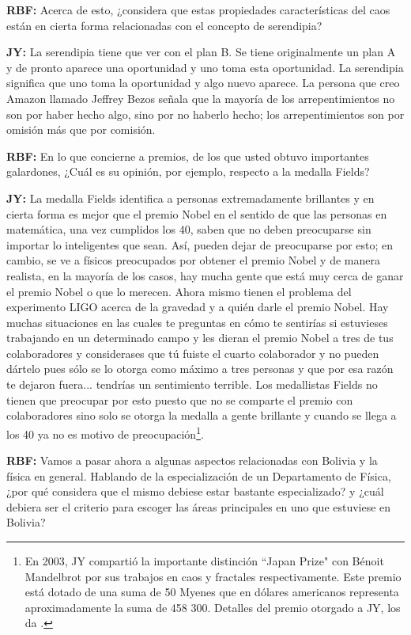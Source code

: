 \documentclass{rbf}
\newcommand{\mr}{{\bf RBF: }}
\newcommand{\jim}{{\bf JY: }}
\begin{document}
\mr Acerca de esto, ¿considera que estas propiedades características del caos están en cierta forma relacionadas con el concepto de serendipia?

\jim La serendipia tiene que ver con el plan B. Se tiene originalmente un plan A y de pronto aparece una oportunidad y uno toma esta oportunidad. La serendipia significa que uno toma la oportunidad y algo nuevo aparece. La persona que creo Amazon llamado Jeffrey Bezos señala que la mayoría de los arrepentimientos no son por haber hecho algo, sino por no haberlo hecho; los arrepentimientos son por omisión
más que por comisión.

\mr En lo que concierne a premios, de los que usted obtuvo importantes galardones, ¿Cuál es su opinión, por ejemplo, respecto a la medalla Fields?

\jim La medalla Fields identifica a personas extremadamente brillantes y en cierta forma es mejor que el premio Nobel en el sentido de que las personas en matemática, una vez cumplidos los 40, saben que no deben preocuparse sin importar lo inteligentes que sean. Así, pueden dejar de preocuparse por esto; en cambio, se ve a físicos preocupados por obtener el premio Nobel y de manera realista, en la mayoría de los casos, hay mucha gente que está muy cerca de ganar el premio Nobel o que lo merecen. Ahora mismo tienen el problema del experimento LIGO acerca de la gravedad y a quién darle el premio Nobel. Hay muchas situaciones en las cuales te preguntas en cómo te sentirías si
estuvieses trabajando en un determinado campo y les dieran el premio Nobel a tres de tus colaboradores y considerases que tú fuiste el cuarto colaborador y no pueden dártelo pues sólo se lo otorga como máximo a tres personas y que por esa razón te dejaron fuera... tendrías un sentimiento terrible. Los medallistas Fields no tienen que preocupar por esto puesto que no se comparte el premio con colaboradores sino solo se otorga la medalla a gente brillante y cuando se llega a los 40 ya no es motivo de preocupación\footnote{En 2003, JY compartió la importante distinción ``Japan Prize" con Bénoit Mandelbrot por sus trabajos en caos y fractales respectivamente. Este premio está dotado de una suma de 50 Myenes que en dólares americanos representa aproximadamente la suma de 458 300. Detalles del premio otorgado a JY, los da \cite{SANJUAN03}.}.

\mr Vamos a pasar ahora a algunas aspectos relacionadas con Bolivia y la física en general. Hablando de la especialización de un Departamento de Física, ¿por qué considera que el mismo debiese estar bastante especializado? y ¿cuál debiera ser el criterio para escoger las áreas principales en uno que estuviese en Bolivia?
\end{document}
